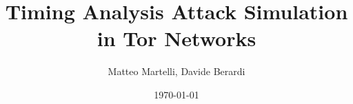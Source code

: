 \documentclass[a4paper]{article}
\title{Timing Analysis Attack Simulation in Tor Networks}
\author{Matteo Martelli, Davide Berardi}
\date{\today}
\begin{document}
\nocite{*}
\maketitle



\newpage







\end{document}
